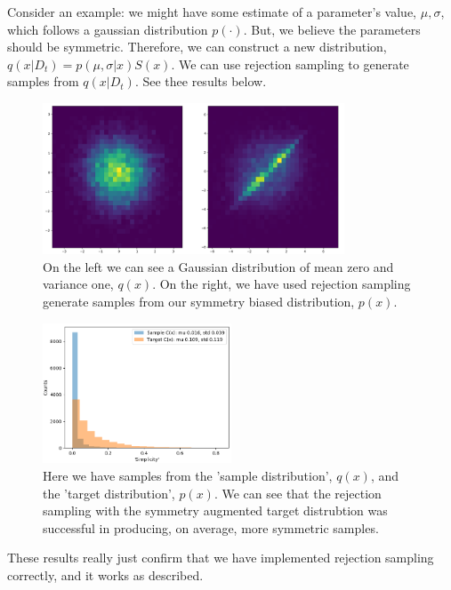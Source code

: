 Consider an example: we might have some estimate of a parameter's value, $\mu, \sigma$, which follows a gaussian distribution $p(\cdot)$. But, we believe the parameters should be symmetric. Therefore, we can construct a new distribution, $q(x | D_t) = p(\mu, \sigma| x)S(x)$. We can use rejection sampling to generate samples from $q(x | D_t)$. See thee results below.


\begin{figure}[h!]
  \centering
  \includegraphics[width=0.8\textwidth,height=0.175\textheight]{../../pictures/figures/symmetric-gaussian.png}
  \caption{On the left we can see a Gaussian distribution of mean zero and variance one, $q(x)$.
  On the right, we have used rejection sampling generate samples from our symmetry biased distribution, $p(x)$.}
\end{figure}

\begin{figure}[h!]
  \centering
  \includegraphics[width=0.5\textwidth,height=0.25\textheight]{../../pictures/figures/s2-prior-rejection-8d.png}
  \caption{Here we have samples from the 'sample distribution', $q(x)$, and the 'target distribution', $p(x)$.
	We can see that the rejection sampling with the symmetry augmented target distrubtion was successful in producing, on average, more symmetric samples. }
\end{figure}

These results really just confirm that we have implemented
rejection sampling correctly, and it works as described.

